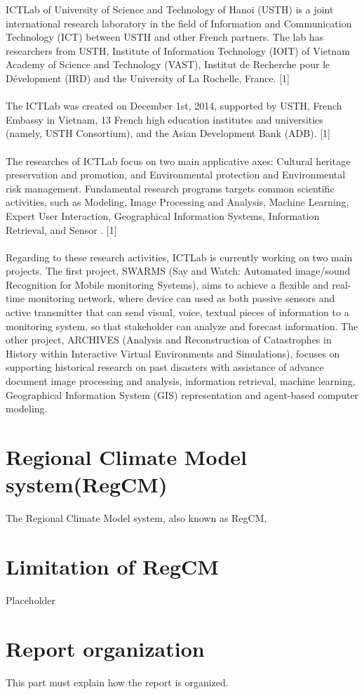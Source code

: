 ICTLab of University of Science and Technology of Hanoi (USTH) is a joint international research laboratory in the field of Information and Communication Technology (ICT) between USTH and other French partners. The lab has researchers from USTH, Institute of Information Technology (IOIT) of Vietnam Academy of Science and Technology (VAST), Institut de Recherche pour le Dévelopment (IRD) and the University of La Rochelle, France. [1] \\
~\\
The ICTLab was created on December 1st, 2014, supported by USTH, French Embassy in Vietnam, 13 French high education institutes and universities (namely, USTH Consortium), and the Asian Development Bank (ADB). [1] \\
~\\
The researches of ICTLab focus on two main applicative axes: Cultural heritage preservation and promotion, and Environmental protection and Environmental risk management. Fundamental research programs targets common scientific activities, such as Modeling, Image Processing and Analysis, Machine Learning, Expert User Interaction, Geographical Information Systems, Information Retrieval, and Sensor . [1] \\
~\\
Regarding to these research activities, ICTLab is currently working on two main projects. The first project, SWARMS (Say and Watch: Automated image/sound Recognition for Mobile monitoring Systems), aims to achieve a flexible and real-time monitoring network, where device can used as both passive sensors and active transmitter that can send visual, voice, textual pieces of information to a monitoring system, so that stakeholder can analyze and forecast information. The other project, ARCHIVES (Analysis and Reconstruction of Catastrophes in History within Interactive Virtual Environments and Simulations), focuses on supporting historical research on past disasters with assistance of advance document image processing and analysis, information retrieval, machine learning, Geographical Information System (GIS) representation and agent-based computer modeling. \\

\section{Regional Climate Model system(RegCM)}

The Regional Climate Model system, also known as RegCM, 
\section{Limitation of RegCM}

\vspace*{1cm}
Placeholder

\section{Report organization}

This part must explain how the report is organized.
